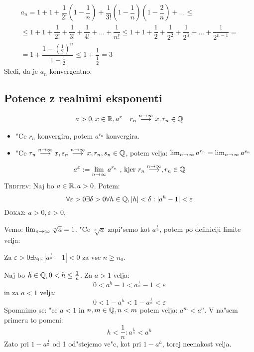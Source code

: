 \begin{multline*}
a_n = 1 + 1 + \dfrac{1}{2!} (1 - \dfrac{1}{n}) + \dfrac{1}{3!} (1 - \dfrac{1}{n}) (1 - \dfrac{2}{n}) + \ldots \leq \\
\leq 1 + 1 + \dfrac{1}{2!} + \dfrac{1}{3!} + \dfrac{1}{4!} + \ldots + \dfrac{1}{n!} \leq 1 + 1 + \dfrac{1}{2} + \dfrac{1}{2^2} + \dfrac{1}{2^3} + \ldots + \dfrac{1}{2^{n-1}}  = \\
= 1 + \dfrac{1 - \left(\frac{1}{2}\right)^n}{1 - \frac{1}{2}} \leq 1 + \dfrac{1}{\frac{1}{2}} = 3
\end{multline*}
Sledi, da je $a_n$ konvergentno.

\subsection{Potence z realnimi eksponenti}
\begin{align*}
a > 0, x \in \mathbb{R}, a^x && r_n \stackrel{n \to \infty}{\longrightarrow} x, r_n \in \mathbb{Q}
\end{align*}
\begin{itemize}
	\item "Ce $r_n$ konvergira, potem $a^{r_n}$ konvergira.
	\item "Ce $r_n \stackrel{n\to \infty}{\longrightarrow} x, s_n \stackrel{n\to \infty}{\longrightarrow} x, r_n, s_n \in \mathbb{Q}$, potem velja: $\lim_{n \rightarrow \infty} a^{r_n} = \lim_{n \rightarrow \infty} a^{s_n}$
\end{itemize}
\begin{equation*}
a^x := \lim_{n \rightarrow \infty} a^{r_n} \text{ , kjer } r_n \stackrel{n\to \infty}{\longrightarrow}, r_n \in \mathbb{Q}
\end{equation*}
\textsc{Trditev:} Naj bo $a \in \mathbb{R}, a > 0$. Potem:
\begin{equation*}
\forall \varepsilon > 0 \exists \delta > 0 \forall h \in \mathbb{Q}, |h| < \delta: |a^h - 1| < \varepsilon
\end{equation*}
\textsc{Dokaz:} $a > 0, \varepsilon > 0$,

Vemo: $\lim_{n \rightarrow \infty} \sqrt[n]{a} = 1$. "Ce $\sqrt[n]{a}$ zapi"semo kot $a^{\frac{1}{n}}$, potem po definiciji limite velja:

Za $\varepsilon > 0 \exists n_0 : |a^{\frac{1}{n}} -1 | < 0$ za vse $n \geq n_0$.

Naj bo $h \in \mathbb{Q}, 0 < h \leq \frac{1}{n}$. Za $a > 1$ velja:
\begin{equation*}
0 < a^h - 1 < a^{\frac{1}{n}} - 1 < \varepsilon
\end{equation*}
in za $a < 1$ velja:
\begin{equation*}
0 < 1-a^h < 1 - a ^{\frac{1}{n}} < \varepsilon
\end{equation*}
Spomnimo se: "ce $a < 1$ in $n, m \in \mathbb{Q}, n < m$ potem velja: $a^m < a^n$. V na"sem primeru to pomeni:
\begin{equation*}
h < \dfrac{1}{n}: a^{\frac{1}{n}} < a^h
\end{equation*}
Zato pri $1-a^{\frac{1}{n}}$ od 1 od"stejemo ve"c, kot pri $1-a^h$, torej neenakost velja.

